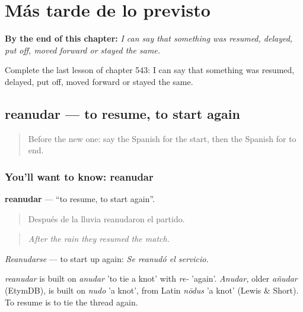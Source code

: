 
\chapter{Más tarde de lo previsto}
\label{ch:es-mas-tarde-de-lo-previsto}

\begin{chapteropening}
\textbf{By the end of this chapter:} \emph{I can say that something was resumed, delayed, put off, moved forward or stayed the same.}

Complete the last lesson of chapter 543: I can say that something was resumed, delayed, put off, moved forward or stayed the same.
\end{chapteropening}

\section[reanudar]{reanudar — to resume, to start again}

\label{lesson:ES-C543-reanudar}



\begin{quote}
Before the new one: say the Spanish for the start, then the Spanish for to end.
\end{quote}

\subsection*{You'll want to know: reanudar}
\textbf{reanudar} — \textquotedblleft{}to resume, to start again\textquotedblright{}.

\begin{quote}
Después de la lluvia reanudaron el partido.
\end{quote}

\begin{quote}
\emph{After the rain they resumed the match.}
\end{quote}

\emph{Reanudarse} — to start up again: \emph{Se reanudó el servicio.}

\begin{cousinweb}
\emph{reanudar} is built on \emph{anudar} 'to tie a knot' with \emph{re-} 'again'. \emph{Anudar}, older \emph{añudar} (EtymDB), is built on \emph{nudo} 'a knot', from Latin \emph{nōdus} 'a knot' (Lewis \& Short). To resume is to tie the thread again.
\end{cousinweb}


